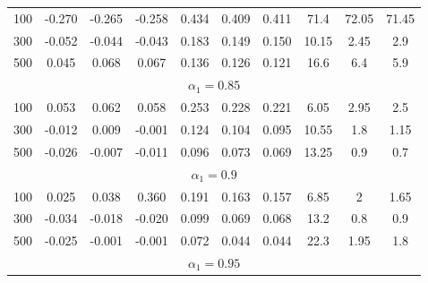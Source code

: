 \begin{table}[!hbt]
\begin{tabular}{lccccccccc}
		\multicolumn{1}{l|}{100}                & -0.270 & -0.265 & \multicolumn{1}{c|}{-0.258} & 0.434 & 0.409 & \multicolumn{1}{c|}{0.411} & 71.4        & 72.05       & 71.45      \\
		\multicolumn{1}{l|}{300}                & -0.052 & -0.044 & \multicolumn{1}{c|}{-0.043} & 0.183 & 0.149 & \multicolumn{1}{c|}{0.150} & 10.15       & 2.45        & 2.9        \\
		\multicolumn{1}{l|}{500}                & 0.045  & 0.068  & \multicolumn{1}{c|}{0.067}  & 0.136 & 0.126 & \multicolumn{1}{c|}{0.121} & 16.6        & 6.4         & 5.9        \\ \hline
		\multicolumn{10}{c}{$\alpha_1 = 0.85$}                                                                                                                          \\ \hline
		\multicolumn{1}{l|}{100}                & 0.053  & 0.062  & \multicolumn{1}{c|}{0.058}  & 0.253 & 0.228 & \multicolumn{1}{c|}{0.221} & 6.05        & 2.95        & 2.5        \\
		\multicolumn{1}{l|}{300}                & -0.012 & 0.009  & \multicolumn{1}{c|}{-0.001} & 0.124 & 0.104 & \multicolumn{1}{c|}{0.095} & 10.55       & 1.8         & 1.15       \\
		\multicolumn{1}{l|}{500}                & -0.026 & -0.007 & \multicolumn{1}{c|}{-0.011} & 0.096 & 0.073 & \multicolumn{1}{c|}{0.069} & 13.25       & 0.9         & 0.7        \\ \hline
		\multicolumn{10}{c}{$\alpha_1 = 0.9$}                                                                                                                           \\ \hline
		\multicolumn{1}{l|}{100}                & 0.025  & 0.038  & \multicolumn{1}{c|}{0.360}  & 0.191 & 0.163 & \multicolumn{1}{c|}{0.157} & 6.85        & 2           & 1.65       \\
		\multicolumn{1}{l|}{300}                & -0.034 & -0.018 & \multicolumn{1}{c|}{-0.020} & 0.099 & 0.069 & \multicolumn{1}{c|}{0.068} & 13.2        & 0.8         & 0.9        \\
		\multicolumn{1}{l|}{500}                & -0.025 & -0.001 & \multicolumn{1}{c|}{-0.001} & 0.072 & 0.044 & \multicolumn{1}{c|}{0.044} & 22.3        & 1.95        & 1.8        \\ \hline
		\multicolumn{10}{c}{$\alpha_1 = 0.95$}                                                                                                                          \\ \hline

\end{tabular}
\end{table}
